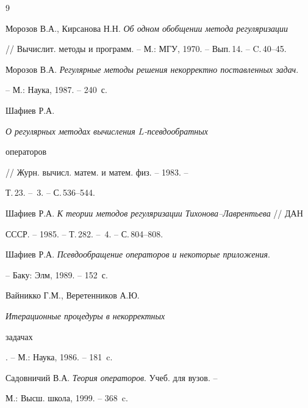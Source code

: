 \begin{thebibliography}{9}







Морозов В.А., Кирсанова Н.Н. {\em Об одном обобщении метода регуляризации}


// Вычислит. методы и программ. -- М.: МГУ, 1970. -- Вып.\,14. -- C.\,40--45.




Морозов В.А. {\em Регулярные методы решения некорректно поставленных задач}.


-- М.: Наука, 1987. -- 240~с. 




Шафиев Р.А. {\em О регулярных методах вычисления $L$-псевдообратных 


операторов} // Журн. вычисл. матем. и матем. физ. -- 1983. --


Т.\,23. -- \No\,3. -- С.\,536--544.




Шафиев Р.А. {\em К теории методов регуляризации Тихонова--Лаврентьева} // ДАН 


СССР. -- 1985. -- Т.\,282. -- \No\,4. -- С.\,804--808.




Шафиев Р.А. {\em Псевдообращение операторов и некоторые приложения}.


-- Баку: Элм, 1989. -- 152~с.




Вайникко Г.М., Веретенников А.Ю. {\em Итерационные процедуры в некорректных 


задачах}. -- М.: Наука, 1986. -- 181~c.




Садовничий В.А. {\em Теория операторов}. Учеб. для вузов. -- 


М.: Высш. школа, 1999. -- 368~c.





\end{thebibliography}





\vskip 2cm












\label{end}




















